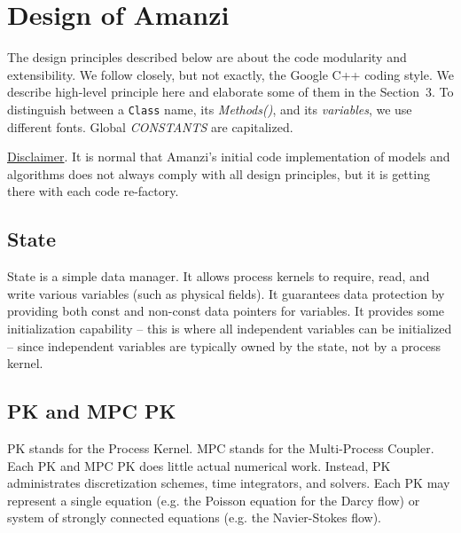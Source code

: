 
\section{Design of Amanzi}

The design principles described below are about the code modularity and extensibility.
We follow closely, but not exactly, the Google C++ coding style.
We describe high-level principle here and elaborate some of them in the
Section~3.
To distinguish between a {\tt Class} name, its {\it Methods()}, and its 
{\it variables}, we use different fonts. 
Global {\it CONSTANTS} are capitalized.

\underline{Disclaimer}. It is normal that Amanzi's initial code implementation of models 
and algorithms does not always comply with all design principles, but it is getting there 
with each code re-factory.


\subsection{State}
State is a simple data manager. 
It allows process kernels to require, read, and write various variables (such as physical fields).
It guarantees data protection by providing both const and non-const data pointers for variables.
It provides some initialization capability -- this is where all independent variables can be 
initialized -- since independent variables are typically owned by the state, not by a process kernel.



\subsection{PK and MPC PK}
PK stands for the Process Kernel.
MPC stands for the Multi-Process Coupler.
Each PK and MPC PK does little actual numerical work.
Instead, PK administrates discretization schemes, time integrators, and solvers. 
Each PK may represent a single equation (e.g. the Poisson equation for the Darcy flow) 
or system of strongly connected equations (e.g. the Navier-Stokes flow).

